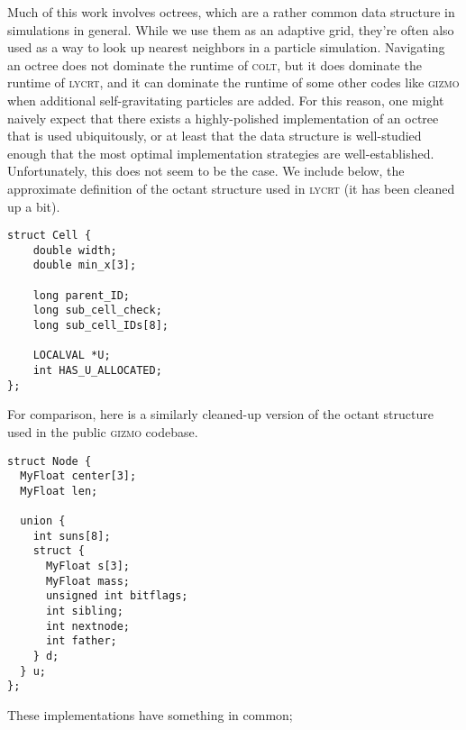 Much of this work involves octrees, which are a rather common data structure in simulations in general.
While we use them as an adaptive grid, they're often also used as a way to look up nearest neighbors in a particle simulation.
Navigating an octree does not dominate the runtime of \textsc{colt}, but it does dominate the runtime of \textsc{lycrt}, and it can dominate the runtime of some other codes like \textsc{gizmo} when additional self-gravitating particles are added.
For this reason, one might naively expect that there exists a highly-polished implementation of an octree that is used ubiquitously, or at least that the data structure is well-studied enough that the most optimal implementation strategies are well-established.
Unfortunately, this does not seem to be the case.
We include below, the approximate definition of the octant structure used in \textsc{lycrt} (it has been cleaned up a bit).
\begin{lstlisting}
struct Cell {
    double width;
    double min_x[3];

    long parent_ID;
    long sub_cell_check;
    long sub_cell_IDs[8];

    LOCALVAL *U;
    int HAS_U_ALLOCATED;
};
\end{lstlisting}
For comparison, here is a similarly cleaned-up version of the octant structure used in the public \textsc{gizmo} codebase.
\begin{lstlisting}
struct Node {
  MyFloat center[3];
  MyFloat len;

  union {
    int suns[8];
    struct {
      MyFloat s[3];
      MyFloat mass;
      unsigned int bitflags;
      int sibling;
      int nextnode;
      int father;
    } d;
  } u;
};
\end{lstlisting}

These implementations have something in common; 
